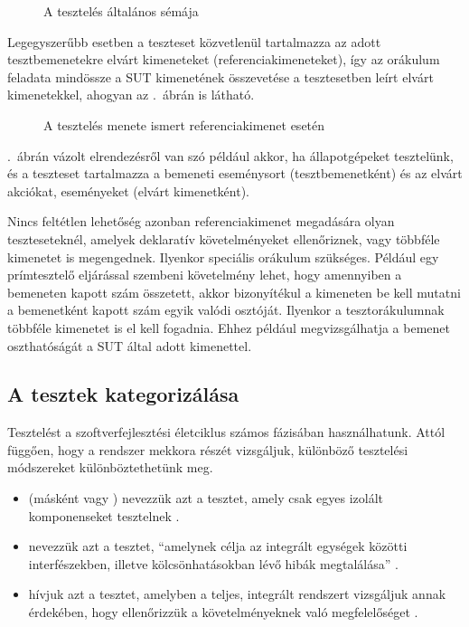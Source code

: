 \begin{figure}[h]
	\centering
	
	
	\caption{A tesztelés általános sémája}
	\label{fig:teszteles-elrendezes-orakulum}
\end{figure}

Legegyszerűbb esetben a teszteset közvetlenül tartalmazza az adott tesztbemenetekre elvárt kimeneteket (referenciakimeneteket), így az orákulum feladata mindössze a SUT kimenetének összevetése a tesztesetben leírt elvárt kimenetekkel, ahogyan az .~ábrán is látható.

\begin{figure}[h]
	\centering
	
	
	\caption{A tesztelés menete ismert referenciakimenet esetén}
	\label{fig:teszteles-elrendezes-elvart-kimenet}
\end{figure}

.~ábrán vázolt elrendezésről van szó például akkor, ha állapotgépeket tesztelünk, és a teszteset tartalmazza a bemeneti eseménysort (tesztbemenetként) és az elvárt akciókat, eseményeket (elvárt kimenetként). 

Nincs feltétlen lehetőség azonban referenciakimenet megadására olyan teszteseteknél, amelyek deklaratív követelményeket ellenőriznek, vagy többféle kimenetet is megengednek. Ilyenkor speciális orákulum szükséges. Például egy prímtesztelő eljárással szembeni követelmény lehet, hogy amennyiben a bemeneten kapott szám összetett, akkor bizonyítékul a kimeneten be kell mutatni a bemenetként kapott szám egyik valódi osztóját. Ilyenkor a tesztorákulumnak többféle kimenetet is el kell fogadnia. Ehhez például megvizsgálhatja a bemenet oszthatóságát a SUT által adott kimenettel.


\subsection{A tesztek kategorizálása\kiegeszitoanyag}
Tesztelést a szoftverfejlesztési életciklus számos fázisában használhatunk. Attól függően, hogy a rendszer mekkora részét vizsgáljuk, különböző tesztelési módszereket különböztethetünk meg.

\begin{itemize}
\item {} (másként  vagy ) nevezzük azt a tesztet, amely csak egyes izolált komponenseket tesztelnek \cite{HTB-glossary}.
\item {} nevezzük azt a tesztet, ``amelynek célja az integrált egységek közötti
interfészekben, illetve kölcsönhatásokban lévő hibák megtalálása''  \cite{HTB-glossary}.
\item {} hívjuk azt a tesztet, amelyben a teljes, integrált rendszert vizsgáljuk annak érdekében, hogy ellenőrizzük a követelményeknek való megfelelőséget \cite{HTB-glossary}.
\end{itemize}

